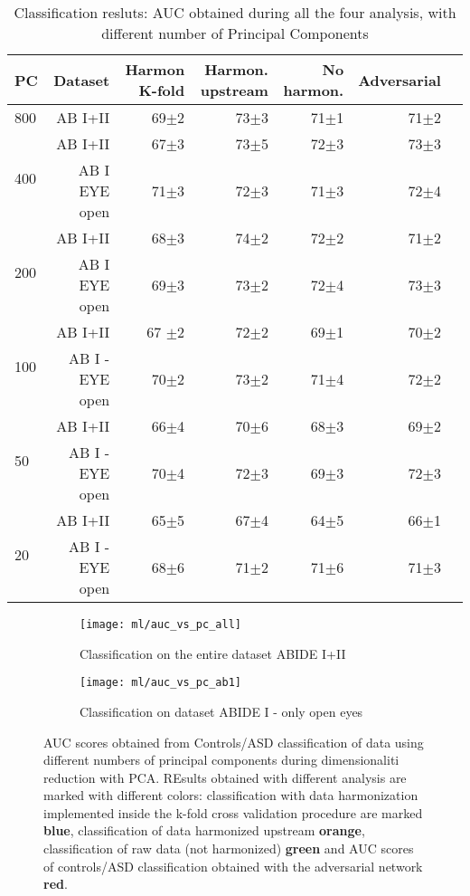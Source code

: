 \documentclass[10pt]{report}
\begin{document}
\begin{table}[!htp]\centering
\scriptsize
\begin{tabular}{lrrrrrr}\toprule
PC &Dataset &Harmon K-fold &Harmon. upstream &No harmon. &Adversarial \\\midrule
800 &AB I+II &69$\pm$2 &73$\pm$3 &71$\pm$1 &71$\pm$2 \\
\hline
\multirow{2}{*}{400} &AB I+II &67$\pm$3 &73$\pm$5 &72$\pm$3 &73$\pm$3 \\
&AB I EYE open &71$\pm$3 &72$\pm$3 &71$\pm$3 &72$\pm$4 \\
\hline
\multirow{2}{*}{200} &AB I+II &68$\pm$3 &74$\pm$2 &72$\pm$2 &71$\pm$2 \\
&AB I EYE open &69$\pm$3 &73$\pm$2 &72$\pm$4 &73$\pm$3 \\
\hline
\multirow{2}{*}{100} &AB I+II &67 $\pm$2 &72$\pm$2 &69$\pm$1 &70$\pm$2 \\
&AB I - EYE open &70$\pm$2 &73$\pm$2 &71$\pm$4 &72$\pm$2 \\
\hline
\multirow{2}{*}{50} &AB I+II &66$\pm$4 &70$\pm$6 &68$\pm$3 &69$\pm$2 \\
&AB I - EYE open &70$\pm$4 &72$\pm$3 &69$\pm$3 &72$\pm$3 \\
\hline
\multirow{2}{*}{20} &AB I+II &65$\pm$5 &67$\pm$4 &64$\pm$5 &66$\pm$1 \\
&AB I - EYE open &68$\pm$6 &71$\pm$2 &71$\pm$6 &71$\pm$3 \\
\bottomrule
\end{tabular}
\caption{Classification resluts: AUC obtained during all the four analysis, with different number of Principal Components}
\label{tab:classification_pearson_pca}
\end{table}





\begin{figure}
\centering
\begin{subfigure}{0.4\textwidth}
   \texttt{[image: ml/auc\_vs\_pc\_all]}
   \caption{Classification on the entire dataset ABIDE I+II}
   \label{}
\end{subfigure}
\begin{subfigure}{0.4\textwidth}
   \texttt{[image: ml/auc\_vs\_pc\_ab1]}
   \caption{Classification on dataset ABIDE I - only open eyes}
   \label{}
\end{subfigure}
\caption{AUC scores obtained from Controls/ASD classification of data using different numbers of principal components during dimensionaliti reduction with PCA.
REsults obtained with different analysis are marked with different colors: classification with data harmonization implemented inside the k-fold cross validation procedure are marked \textbf{blue}, classification of data harmonized upstream \textbf{orange}, classification of raw data (not harmonized) \textbf{green} and AUC scores of controls/ASD classification obtained with the adversarial network \textbf{red}.
}
\label{fig:classification_pearson_pca}
\end{figure}
\end{document}
